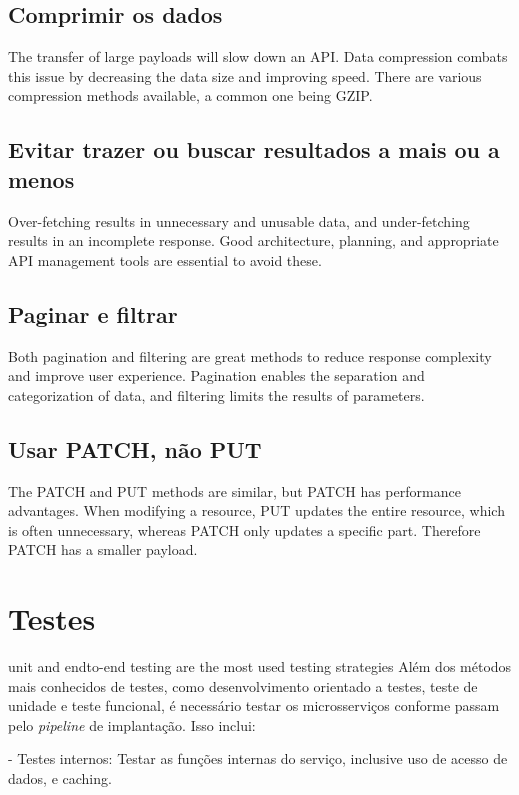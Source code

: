 \subsection{Comprimir os dados}
The transfer of large payloads will slow down an API. Data compression combats this issue by decreasing the data size and improving speed. There are various compression methods available, a common one being GZIP. \cite{rapidAPI-twitter}

\subsection{Evitar trazer ou buscar resultados a mais ou a menos}
Over-fetching results in unnecessary and unusable data, and under-fetching results in an incomplete response. Good architecture, planning, and appropriate API management tools are essential to avoid these. \cite{rapidAPI-twitter}

\subsection{Paginar e filtrar}
Both pagination and filtering are great methods to reduce response complexity and improve user experience. Pagination enables the separation and categorization of data, and filtering limits the results of parameters. \cite{rapidAPI-twitter}

\subsection{Usar PATCH, não PUT}
The PATCH and PUT methods are similar, but PATCH has performance advantages. When modifying a resource, PUT updates the entire resource, which is often unnecessary, whereas PATCH only updates a specific part. Therefore PATCH has a smaller payload. \cite{rapidAPI-twitter}

\section{Testes}
unit and endto-end testing are the most used testing strategies \cite{design-monitoring-testing-waseem}
Além dos métodos mais conhecidos de testes, como desenvolvimento orientado a testes, teste de unidade e teste funcional, é necessário testar os microsserviços conforme passam pelo \emph{pipeline} de implantação. Isso inclui:

- Testes internos: Testar as funções internas do serviço, inclusive uso de acesso de dados, e caching.

